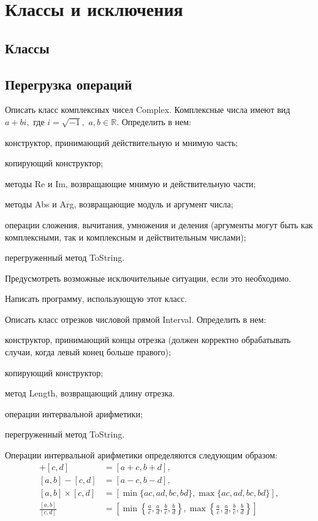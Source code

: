 \section{Классы и исключения}

\subsection{Классы}

\subsection{Перегрузка операций}

\task Описать класс комплексных чисел Complex. Комплексные числа имеют
вид $a+bi,$ где $i=\sqrt{-1},$ $a,b \in \mathbb{R}$. Определить в нем:
\begin{itemize*}
\item конструктор, принимающий действительную и мнимую часть;
\item копирующий конструктор;
\item методы Re и Im, возвращающие мнимую и действительную части;
\item методы Abs и Arg, возвращающие модуль и аргумент числа;
\item операции сложения, вычитания, умножения и деления (аргументы
  могут быть как комплексными, так и комплексным и действительным
  числами);
\item перегруженный метод ToString.
\end{itemize*}

Предусмотреть возможные исключительные ситуации, если это необходимо.

Написать программу, использующую этот класс.

\task Описать класс отрезков числовой прямой Interval. Определить в нем:
\begin{itemize*}
\item конструктор, принимающий концы отрезка (должен корректно
  обрабатывать случаи, когда левый конец больше правого);
\item копирующий конструктор;
\item метод Length, возвращающий длину отрезка.
\item операции интервальной арифметики;
\item перегруженный метод ToString.
\end{itemize*}

Операции интервальной арифметики определяются следующим образом:
\begin{align*}
[a, b] + [c, d] &= [a + c, b + d],\\
[a, b] - [c, d] &= [a - c, b - d],\\
[a, b] \times [c, d] &= [\min \{ac, ad, bc, bd\}, \max \{ac, ad, bc, bd\}],\\
\frac{[a, b]}{[c, d]} &=  \left[\min \left\{\frac{a}{c}, \frac{a}{d}, \frac{b}{c}, \frac{b}{d}\right\}, \max \left\{\frac{a}{c}, \frac{a}{d}, \frac{b}{c}, \frac{b}{d}\right\}\right]
\end{align*}


